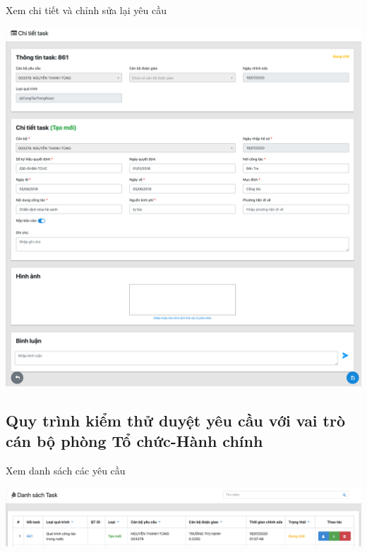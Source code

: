 Xem chi tiết và chỉnh sửa lại yêu cầu
\begin{center}
  \captionsetup{type=figure}
  \includegraphics[width=15cm]{img/test/taskDetailUser.png}
\end{center}
\subsection{Quy trình kiểm thử duyệt yêu cầu với vai trò cán bộ phòng Tổ chức-Hành chính}
Xem danh sách các yêu cầu
\begin{center}
  \captionsetup{type=figure}
  \includegraphics[width=15cm]{img/test/adminTask.png}
\end{center}


